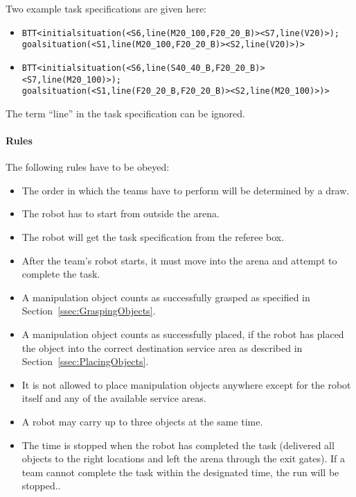 Two example task specifications are given here:
\begin{itemize}
	\item \texttt{BTT\textless initialsituation(\textless S6,line(M20\_100,F20\_20\_B)\textgreater \textless S7,line(V20)\textgreater);} \\
	\texttt{goalsituation(\textless S1,line(M20\_100,F20\_20\_B)\textgreater \textless S2,line(V20)\textgreater )\textgreater}

	\item \texttt{BTT\textless initialsituation(\textless S6,line(S40\_40\_B,F20\_20\_B)\textgreater \textless S7,line(M20\_100)\textgreater);} \\
	\texttt{goalsituation(\textless S1,line(F20\_20\_B,F20\_20\_B)>\textless S2,line(M20\_100)\textgreater )\textgreater}

\end{itemize}

The term “line” in the task specification can be ignored.

%

\paragraph{Rules}
The following rules have to be obeyed:

\begin{itemize}
\item The order in which the teams have to perform will be determined by a draw.
\item The robot has to start from outside the arena.
\item The robot will get the task specification from the referee box.
\item After the team's robot starts, it must move into the arena and attempt to complete the task. 
\item A manipulation object counts as successfully grasped as specified in Section~\ref{ssec:GraspingObjects}.
\item A manipulation object counts as successfully placed, if the robot has placed the object into the correct destination service area as described in Section~\ref{ssec:PlacingObjects}.
\item It is not allowed to place manipulation objects anywhere except for the robot itself and any of the available service areas.
\item A robot may carry up to three objects at the same time.
\item The time is stopped when the robot has completed the task (delivered all objects to the right locations and left the arena through the exit gates). If a team cannot complete the task within the designated time, the run will be stopped.. 

\end{itemize}


